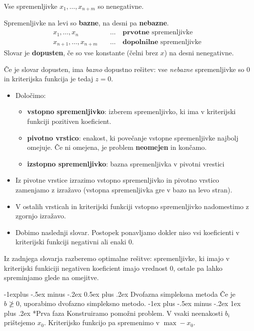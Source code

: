 \documentclass[a4paper,8pt]{extarticle}
\makeatletter
\renewcommand{\subsection}{\@startsection{subsection}{2}{0mm}%
                                {-1explus -.5ex minus -.2ex}%
                                {0.5ex plus .2ex}%
                                {\normalfont\normalsize\bfseries}}
\renewcommand{\subsubsection}{\@startsection{subsubsection}{3}{0mm}%
                                {-1ex plus -.5ex minus -.2ex}%
                                {1ex plus .2ex}%
                                {\normalfont\small\bfseries}}
\makeatother
\begin{document}
\begin{multicols}{4}
Vse spremenljivke $x_1, \dots, x_{n+m}$ so nenegativne.

Spremenljivke na levi so \textbf{bazne}, na desni pa \textbf{nebazne}.
\begin{align*}
	x_1, \dots, x_n &\quad \dots \quad \textbf{prvotne} \text{ spremenljivke} \\
	x_{n+1}, \dots, x_{n+m} &\quad \dots \quad \textbf{dopolnilne} \text{ spremenljivke}
\end{align*}
Slovar je \textbf{dopusten}, če so vse konstante (čelni brez $x$) na desni nenegativne.

Če je slovar dopusten, ima \emph{bazno} dopustno rešitev: vse \emph{nebazne} spremenljivke so 0 in kriterijska funkcija je tedaj $z = 0$.
\begin{itemize}
	\item Določimo:
	\begin{itemize}
		\item \textbf{vstopno spremenljivko}: izberem spremenljivko, ki ima v kriterijski funkciji pozitiven koeficient. \\
		\item \textbf{pivotno vrstico}: enakost, ki povečanje vstopne spremenljivke najbolj omejuje. Če ni omejena, je problem \textbf{neomejen} in končamo.\\
		\item \textbf{izstopno spremenljivko}: bazna spremenljivka v pivotni vrestici
	\end{itemize}
	\item Iz pivotne vrstice izrazimo vstopno spremenljivko in pivotno vrstico zamenjamo z izražavo (vstopna spremenljivka gre v bazo na levo stran).
	\item V ostalih vrsticah in kriterijski funkciji vstopno spremenljivko nadomestimo z zgornjo izražavo.
	\item Dobimo naslednji slovar. Postopek ponavljamo dokler niso vsi koeficienti v kriterijski funkciji negativni ali enaki 0.
\end{itemize}

Iz zadnjega slovarja razberemo optimalne rešitve: spremenljivke, ki imajo v kriterijski funkiciji negativen koeficient imajo vrednost 0, ostale pa lahko spreminjamo glede na omejitve.

\subsection{Dvofazna simpleksna metoda}
Če je $b \ngeq 0$, uporabimo dvofazno simpleksno metodo.
\subsubsection*{Prva faza}
Konstruiramo pomožni problem. V vsaki neenakosti $b_i$ prištejemo $x_0$. Kriterijsko funkcijo pa spremenimo v $\max -x_0$.


\end{multicols}
\end{document}
